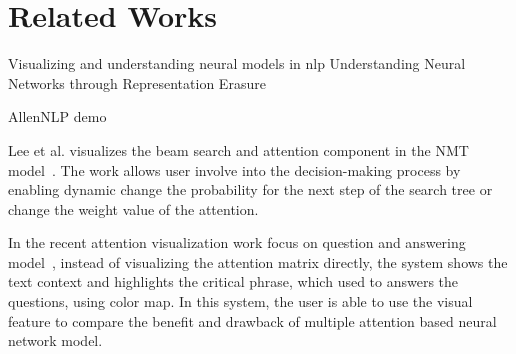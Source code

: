 \section{Related Works}

Visualizing and understanding neural models in nlp \cite{LiChenHovy2015}
Understanding Neural Networks through Representation Erasure \cite{li2016understanding}

AllenNLP demo 

Lee et al. visualizes the beam search and attention component in the NMT model~\cite{lee2017interactive}. The work allows user involve into the decision-making process by enabling dynamic change the probability for the next step of the search tree or change the weight value of the attention.

In the recent attention visualization work focus on question and answering model~\cite{ruckle2017end}, 
instead of visualizing the attention matrix directly, the system shows the text context and highlights the critical phrase, which used to answers the questions, using color map. In this system, the user is able to use the visual feature to compare the benefit and drawback of multiple attention based neural network model.
